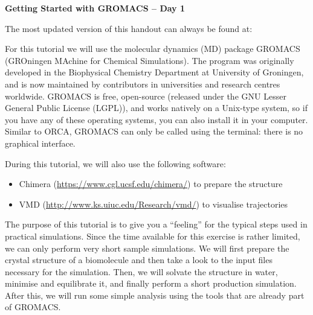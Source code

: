 \documentclass[10pt]{article}
\begin{document}
\textbf{\LARGE Getting Started with GROMACS -- Day 1}

\vspace{0.5cm}

\begin{tcolorbox}[colframe=Green!70!white, colback=Green!10!white, width=0.95\textwidth, center]
    The most updated version of this handout can always be found at:
    \vspace{0.2cm}
    \begin{center}
    \end{center}
\end{tcolorbox}

\vspace{0.2cm}

For this tutorial we will use the molecular dynamics (MD) package GROMACS (GROningen MAchine for Chemical Simulations). The program was originally developed in the Biophysical Chemistry Department at University of Groningen, and is now maintained by contributors in universities and research centres worldwide. GROMACS is free, open-source (released under the GNU Lesser General Public License (LGPL)), and works natively on a Unix-type system, so if you have any of these operating systems, you can also install it in your computer. Similar to ORCA, GROMACS can only be called using the terminal: there is no graphical interface.

During this tutorial, we will also use the following software:

\begin{itemize}
	 \item Chimera (\url{https://www.cgl.ucsf.edu/chimera/}) to prepare the structure 
	\item VMD (\url{http://www.ks.uiuc.edu/Research/vmd/}) to visualise trajectories
\end{itemize}

The purpose of this tutorial is to give you a ``feeling'' for the typical steps used in practical simulations. Since the time available for this exercise is rather limited, we can only perform very short sample simulations. We will first prepare the crystal structure of a biomolecule and then take a look to the input files necessary for the simulation. Then, we will solvate the structure in water, minimise and equilibrate it, and finally perform a short production simulation. After this, we will run some simple analysis using the tools that are already part of GROMACS.
\end{document}
